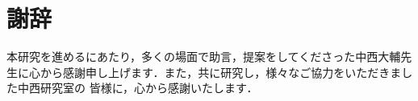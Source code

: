 \newpage
\section{謝辞}
本研究を進めるにあたり，多くの場面で助言，提案をしてくださった中西大輔先生に心から感謝申し上げます．また，共に研究し，様々なご協力をいただきました中西研究室の
皆様に，心から感謝いたします．